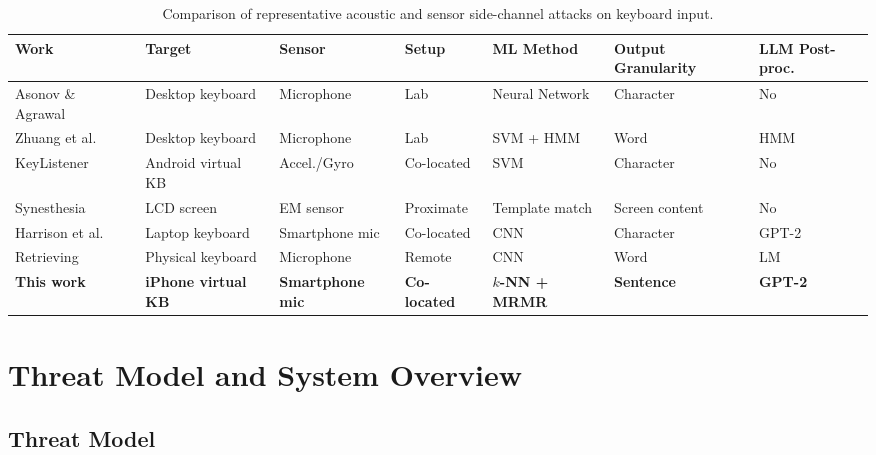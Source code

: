 \documentclass[conference]{IEEEtran}
\begin{document}
\FloatBarrier
\begin{table}[!ht]
\centering
\caption{Comparison of representative acoustic and sensor side-channel attacks on keyboard input.}
\label{tab:comparison}
\renewcommand{\arraystretch}{1.2}
\begin{tabular}{lllllll}
\toprule
\textbf{Work} & \textbf{Target} & \textbf{Sensor} & \textbf{Setup} & \textbf{ML Method} & \textbf{Output Granularity} & \textbf{LLM Post-proc.} \\
\midrule
Asonov \& Agrawal~\cite{asonov2004keyboard}   & Desktop keyboard  & Microphone   & Lab       & Neural Network      & Character          & No  \\
Zhuang et al.~\cite{zhuang2009keyboard}        & Desktop keyboard  & Microphone   & Lab       & SVM + HMM           & Word               & HMM \\
KeyListener~\cite{lu2019keylistener}           & Android virtual KB & Accel./Gyro & Co-located & SVM                & Character          & No  \\
Synesthesia~\cite{genkin2019synesthesia}       & LCD screen        & EM sensor    & Proximate  & Template match      & Screen content     & No  \\
Harrison et al.~\cite{harrison2023}            & Laptop keyboard   & Smartphone mic & Co-located & CNN               & Character          & GPT-2 \\
Retrieving~\cite{retrieving2021}              & Physical keyboard  & Microphone   & Remote     & CNN                & Word               & LM  \\
\textbf{This work}                             & \textbf{iPhone virtual KB} & \textbf{Smartphone mic} & \textbf{Co-located} & \textbf{$k$-NN + MRMR} & \textbf{Sentence} & \textbf{GPT-2} \\
\bottomrule
\end{tabular}
\end{table}
\FloatBarrier

\section{Threat Model and System Overview}

\subsection{Threat Model}
\end{document}
